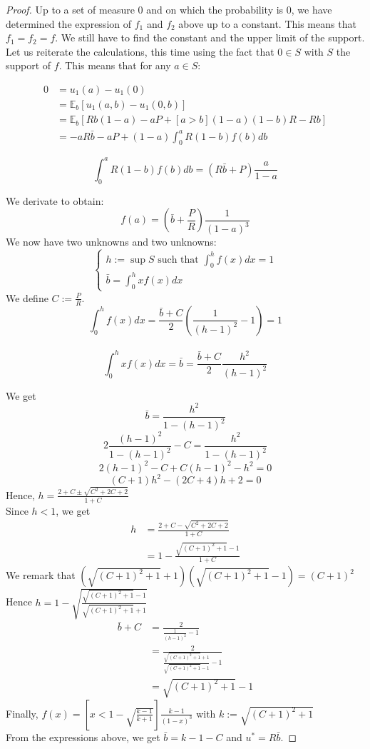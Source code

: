 \documentclass[preprint,12pt,authoryear,doubleblind]{elsarticle}
\theoremstyle{definition}
\begin{document}
\begin{proof}
Up to a set of measure 0 and on which the probability is 0, we have determined the expression of $f_1$ and $f_2$ above up to a constant. This means that $f_1 = f_2 = f$.
We still have to find the constant and the upper limit of the support.
Let us reiterate the calculations, this time using the fact that $0 \in S$ with $S$ the support of $f$. This means that for any $a\in S$:

\begin{align*}0 &= u_1(a) - u_1(0)\\
&= \mathbb{E}_b[u_1(a, b) - u_1(0, b)]\\
&= \mathbb{E}_b\left[Rb(1-a) - aP  + [a>b](1-a)(1-b)R - Rb \right]\\
&= -a R \bar b - a P + (1-a) \int_0^a R (1-b) f(b) db\end{align*}

$$\int_0^a R (1-b) f(b) db = (R \bar b + P) \frac{a}{1-a}$$

We derivate to obtain:
$$f(a) = \left(\bar b + \frac{P}{R}\right) \frac{1}{(1-a)^3}$$
We now have two unknowns and two unknowns:
$$
\left\{ \begin{array}{ll}
h := \sup S  \text{ such that } \int_0^h f(x) dx = 1\\
\bar b = \int_0^h x f(x) dx
\end{array} \right.
$$
We define $C := \frac{P}{R}$.\\
$$\int_0^h f(x) dx = \frac{\bar b + C}{2} \left(\frac{1}{(h-1)^2}-1\right) = 1$$\\
$$\int_0^h x f(x) dx = \bar b = \frac{\bar b + C}{2} \frac{h^2}{(h-1)^2}$$

We get
$$\bar b = \frac{h^2}{1-(h-1)^2}$$
$$2 \frac{(h-1)^2}{1 - (h-1)^2} - C = \frac{h^2}{1 - (h-1)^2}$$
$$2(h-1)^2 - C + C (h-1)^2 - h^2 = 0$$
$$(C + 1) h^2 - (2 C + 4) h + 2 = 0$$
Hence, $h = \frac{2 + C \pm \sqrt{C^2 + 2 C + 2}}{1 + C}$\\
Since $h<1$, we get
\begin{align*}
    h &= \frac{2 + C - \sqrt{C^2 + 2 C + 2}}{1 + C}\\
      &= 1 - \frac{\sqrt{(C + 1)^2 + 1} - 1}{1+C}
\end{align*}
We remark that $(\sqrt{(C + 1)^2 + 1} + 1)( \sqrt{(C + 1)^2 + 1} - 1) = (C+1)^2$\\
Hence $h = 1 - \sqrt{\frac{\sqrt{(C + 1)^2 + 1} - 1}{\sqrt{(C + 1)^2 + 1} + 1}}$
\begin{align*}\bar b + C &=\frac{2}{\frac{1}{(h-1)^2} - 1}\\
&= \frac{2}{\frac{\sqrt{(C + 1)^2 + 1} + 1}{\sqrt{(C + 1)^2 + 1} - 1} - 1}\\
&= \sqrt{(C + 1)^2 + 1} - 1\end{align*}
Finally, $f(x) = \left[x < 1 - \sqrt{\frac{k - 1}{k + 1}}\right] \frac{ k - 1}{(1-x)^3}$ with $k := \sqrt{(C + 1)^2 + 1}$\\
From the expressions above, we get $\bar b = k - 1 - C$ and $u^* = R \bar b$.
\end{proof}
\end{document}
